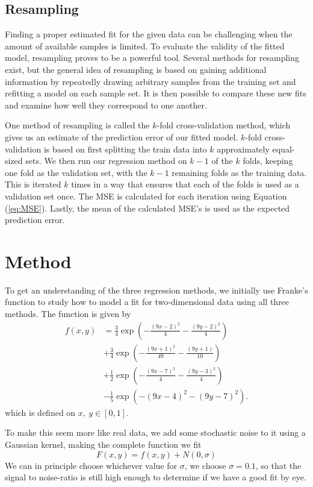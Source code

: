 \documentclass[a4paper, 10pt]{article}
\begin{document}
\begin{multicols}{2}
\subsection{Resampling}
Finding a proper estimated fit for the given data can be challenging when the amount of available samples is limited. To evaluate the validity of the fitted model, resampling proves to be a powerful tool. Several methods for resampling exist, but the general idea of resampling is based on gaining additional information by repeatedly drawing arbitrary samples from the training set and refitting a model on each sample set. It is then possible to compare these new fits and examine how well they correspond to one another.

One method of resampling is called the $k$-fold cross-validation method, which gives us an estimate of the prediction error of our fitted model. $k$-fold cross-validation is based on first splitting the train data into $k$ approximately equal-sized sets.  We then run our regression method on $k-1$ of the $k$ folds, keeping one fold as the validation set, with the $k-1$ remaining folds as the training data. This is iterated $k$ times in a way that ensures that each of the folds is used as a validation set once. The MSE is calculated for each iteration using Equation (\ref{eq:MSE}). Lastly, the mean of the calculated MSE's is used as the expected prediction error. 


\section{Method}
To get an understanding of the three regression methods, we initially use Franke's function to study how to model a fit for two-dimensional data using all three methods. The function is given by
\begin{align}
f(x,y) &= \frac{3}{4}\exp{\left(-\frac{(9x-2)^2}{4}   - \frac{(9y-2)^2}{4}\right)} \nonumber\\
 &+\frac{3}{4}\exp{\left(-\frac{(9x+1)^2}{49}- \frac{(9y+1)}{10}\right)} \nonumber\\
 &+\frac{1}{2}\exp{\left(-\frac{(9x-7)^2}{4} - \frac{(9y-3)^2}{4}\right)} \nonumber\\
 &-\frac{1}{5}\exp{\left(-(9x-4)^2 - (9y-7)^2\right) }. \label{eq:Franke}
\end{align} which is defined on $x,\ y \in [0,1]$.

To make this seem more like real data, we add some stochastic noise to it using a Gaussian kernel, making the complete function we fit
\begin{equation}
F(x, y) = f(x, y) + N(0, \sigma) \label{Franke noise}
\end{equation}
We can in principle choose whichever value for $\sigma$, we choose $\sigma=0.1$, so that the signal to noise-ratio is still high enough to determine if we have a good fit by eye. 


\end{multicols}
\end{document}
